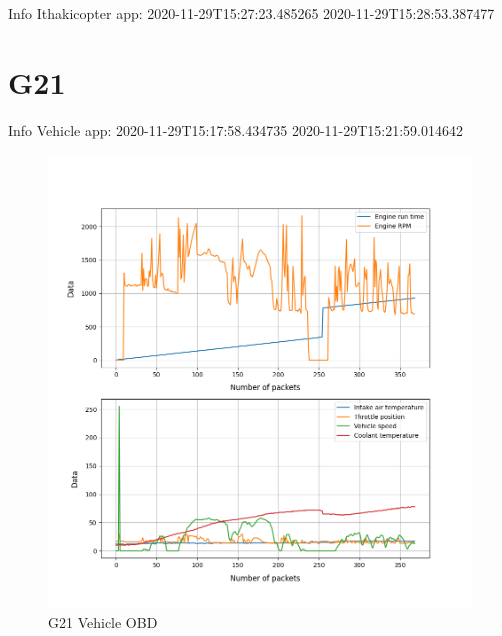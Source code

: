 \documentclass[hidelinks, 12pt, a4paper]{article}
\begin{document}
Info Ithakicopter app:
2020-11-29T15:27:23.485265
2020-11-29T15:28:53.387477

\section{G21}
Info Vehicle app:
2020-11-29T15:17:58.434735
2020-11-29T15:21:59.014642

\begin{figure}[h!]
\centering
	\includegraphics[height=.5\textheight, width=\textwidth]{assets/session2/g21.png}
    \caption{G21 Vehicle OBD}
\end{figure}
\end{document}
